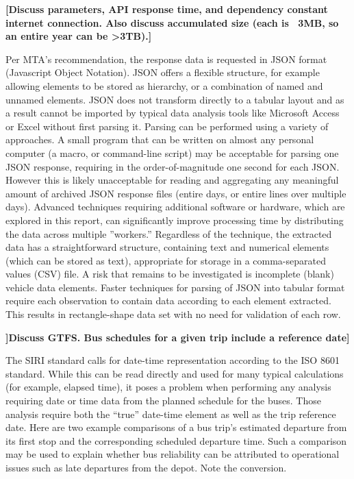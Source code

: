 \documentclass[12pt]{report}
\begin{document}
\textbf{[Discuss parameters, API response time, and dependency constant internet connection.  Also discuss accumulated size (each is ~3MB, so an entire year can be >3TB).]}

Per MTA's recommendation, the response data is requested in JSON format (Javascript Object Notation).  JSON offers a flexible structure, for example allowing elements to be stored as hierarchy, or a combination of named and unnamed elements.  JSON does not transform directly to a tabular layout and as a result cannot be imported by typical data analysis tools like Microsoft Access or Excel without first parsing it.
Parsing can be performed using a variety of approaches.  A small program that can be written on almost any personal computer (a macro, or command-line script) may be acceptable for parsing one JSON response, requiring in the order-of-magnitude one second for each JSON.  However this is likely unacceptable for reading and aggregating any meaningful amount of archived JSON response files (entire days, or entire lines over multiple days).  Advanced techniques requiring additional software or hardware, which are explored in this report, can significantly improve processing time by distributing the data across multiple ''workers.''  Regardless of the technique, the extracted data has a straightforward structure, containing text and numerical elements (which can be stored as text), appropriate for storage in a comma-separated values (CSV) file.
A risk that remains to be investigated is incomplete (blank) vehicle data elements.  Faster techniques for parsing of JSON into tabular format require each observation to contain data according to each element extracted.  This results in rectangle-shape data set with no need for validation of each row.

\textbf{]Discuss GTFS. Bus schedules for a given trip include a reference date]}

The SIRI standard calls for date-time representation according to the ISO 8601 standard.  While this can be read directly and used for many typical calculations (for example, elapsed time), it poses a problem when performing any analysis requiring date or time data from the planned schedule for the buses.  Those analysis require both the “true'' date-time element as well as the trip reference date.  Here are two example comparisons of a bus trip's estimated departure from its first stop and the corresponding scheduled departure time. Such a comparison may be used to explain whether bus reliability can be attributed to operational issues such as late departures from the depot.  Note the conversion.
\end{document}

